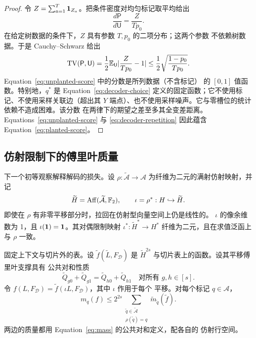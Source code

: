 \begin{proof}
令 $Z=\sum_{a=1}^T\mathbf 1_{Z_a}$。把条件密度对均匀标记取平均给出
\[
 \frac{d\mathsf P}{d\mathsf U}=\frac{Z}{Tp_0}.
\]
在给定树数据的条件下，$Z$ 具有参数 $T,p_0$ 的二项分布；这两个参数
不依赖树数据。于是 Cauchy--Schwarz 给出
\[
 \operatorname{TV}(\mathsf P,\mathsf U)
 =\frac12\mathbb E_{\mathsf U}\lvert\frac{Z}{Tp_0}-1\rvert
 \leq\frac12\sqrt{\frac{1-p_0}{Tp_0}}.
\]
Equation~\eqref{eq:unplanted-score} 中的分数是所列数据（不含标记）
的 $[0,1]$ 值函数。特别地，$q^*$ 是 Equation~\eqref{eq:decoder-choice}
定义的固定函数；它不使用标记、不使用采样关联边（超出其 $Y$
端点）、也不使用采样噪声。它与零槽位的统计依赖不造成困难。该分数
在两律下的期望之差至多其全变差距离。
Equations~\eqref{eq:unplanted-score} 与 \eqref{eq:decoder-repetition}
因此蕴含 Equation~\eqref{eq:planted-score}。
\end{proof}

\subsection{仿射限制下的傅里叶质量}

下一个初等观察解释解码的损失。设 $\rho:\widetilde{\mathcal A}\to\mathcal A$
为纤维为二元的满射仿射映射，并记
\[
 \widetilde H=\operatorname{Aff}(\widetilde{\mathcal A},\mathbb F_2),\qquad
 \iota=\rho^*:H\hookrightarrow\widetilde H.
\]
即使在 $\rho$ 有非零平移部分时，拉回在仿射型向量空间上仍是线性的。
$\iota$ 的像余维数为 1，且 $\iota(\mathbf 1)=\mathbf 1$。其对偶限制映射
$\iota^*:\widetilde H^*\to H^*$ 纤维为二元，且在求值泛函上与
$\rho$ 一致。

\begin{lemma}[平移质量的限制]\label{lem:restriction}
固定上下文与切片外的表。设 $\widetilde f(\widetilde L,F_{\mathcal D})$
是 $\widetilde H^{2s}$ 与切片表上的函数。设其平移傅里叶支撑具有
公共对和性质
\[
 \widetilde Q_{g0}+\widetilde Q_{g1}
 =\widetilde Q_{h0}+\widetilde Q_{h1}
 \quad\text{对所有 }g,h\in[s].
\]
令 $f(L,F_{\mathcal D})=
\widetilde f(\iota L,F_{\mathcal D})$，其中 $\iota$ 作用于每个
平移。对每个标记 $q\in\mathcal A$，
\begin{equation}\label{eq:restriction-mass}
 m_q(f)\leq 2^{2s}
       \sum_{\substack{\widetilde q\in\widetilde{\mathcal A}\\
                       \rho(\widetilde q)=q}}
          \widetilde m_{\widetilde q}(\widetilde f).
\end{equation}
两边的质量都用 Equation~\eqref{eq:mass} 的公共对和定义，配各自的
仿射行空间。
\end{lemma}


